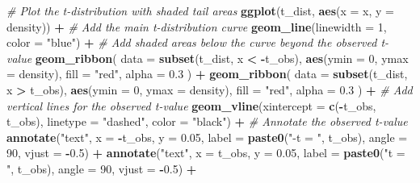 \documentclass[
]{book}
\newenvironment{Shaded}{\begin{snugshade}}{\end{snugshade}}
\newcommand{\AttributeTok}[1]{\textcolor[rgb]{0.13,0.29,0.53}{#1}}
\newcommand{\CommentTok}[1]{\textcolor[rgb]{0.56,0.35,0.01}{\textit{#1}}}
\newcommand{\DecValTok}[1]{\textcolor[rgb]{0.00,0.00,0.81}{#1}}
\newcommand{\FloatTok}[1]{\textcolor[rgb]{0.00,0.00,0.81}{#1}}
\newcommand{\FunctionTok}[1]{\textcolor[rgb]{0.13,0.29,0.53}{\textbf{#1}}}
\newcommand{\NormalTok}[1]{#1}
\newcommand{\SpecialCharTok}[1]{\textcolor[rgb]{0.81,0.36,0.00}{\textbf{#1}}}
\newcommand{\StringTok}[1]{\textcolor[rgb]{0.31,0.60,0.02}{#1}}
\begin{document}
\begin{Shaded}
\begin{Highlighting}[]
\CommentTok{\# Plot the t{-}distribution with shaded tail areas}
\FunctionTok{ggplot}\NormalTok{(t\_dist, }\FunctionTok{aes}\NormalTok{(}\AttributeTok{x =}\NormalTok{ x, }\AttributeTok{y =}\NormalTok{ density)) }\SpecialCharTok{+}
  \CommentTok{\# Add the main t{-}distribution curve}
  \FunctionTok{geom\_line}\NormalTok{(}\AttributeTok{linewidth =} \DecValTok{1}\NormalTok{, }\AttributeTok{color =} \StringTok{"blue"}\NormalTok{) }\SpecialCharTok{+}
  \CommentTok{\# Add shaded areas below the curve beyond the observed t{-}value}
  \FunctionTok{geom\_ribbon}\NormalTok{(}
    \AttributeTok{data =} \FunctionTok{subset}\NormalTok{(t\_dist, x }\SpecialCharTok{\textless{}} \SpecialCharTok{{-}}\NormalTok{t\_obs),}
    \FunctionTok{aes}\NormalTok{(}\AttributeTok{ymin =} \DecValTok{0}\NormalTok{, }\AttributeTok{ymax =}\NormalTok{ density),}
    \AttributeTok{fill =} \StringTok{"red"}\NormalTok{,}
    \AttributeTok{alpha =} \FloatTok{0.3}
\NormalTok{  ) }\SpecialCharTok{+}
  \FunctionTok{geom\_ribbon}\NormalTok{(}
    \AttributeTok{data =} \FunctionTok{subset}\NormalTok{(t\_dist, x }\SpecialCharTok{\textgreater{}}\NormalTok{ t\_obs),}
    \FunctionTok{aes}\NormalTok{(}\AttributeTok{ymin =} \DecValTok{0}\NormalTok{, }\AttributeTok{ymax =}\NormalTok{ density),}
    \AttributeTok{fill =} \StringTok{"red"}\NormalTok{,}
    \AttributeTok{alpha =} \FloatTok{0.3}
\NormalTok{  ) }\SpecialCharTok{+}
  \CommentTok{\# Add vertical lines for the observed t{-}value}
  \FunctionTok{geom\_vline}\NormalTok{(}\AttributeTok{xintercept =} \FunctionTok{c}\NormalTok{(}\SpecialCharTok{{-}}\NormalTok{t\_obs, t\_obs),}
             \AttributeTok{linetype =} \StringTok{"dashed"}\NormalTok{, }\AttributeTok{color =} \StringTok{"black"}\NormalTok{) }\SpecialCharTok{+}
  \CommentTok{\# Annotate the observed t{-}value}
  \FunctionTok{annotate}\NormalTok{(}\StringTok{"text"}\NormalTok{, }\AttributeTok{x =} \SpecialCharTok{{-}}\NormalTok{t\_obs, }\AttributeTok{y =} \FloatTok{0.05}\NormalTok{,}
           \AttributeTok{label =} \FunctionTok{paste0}\NormalTok{(}\StringTok{"{-}t = "}\NormalTok{, t\_obs), }\AttributeTok{angle =} \DecValTok{90}\NormalTok{, }\AttributeTok{vjust =} \SpecialCharTok{{-}}\FloatTok{0.5}\NormalTok{) }\SpecialCharTok{+}
  \FunctionTok{annotate}\NormalTok{(}\StringTok{"text"}\NormalTok{, }\AttributeTok{x =}\NormalTok{ t\_obs, }\AttributeTok{y =} \FloatTok{0.05}\NormalTok{,}
           \AttributeTok{label =} \FunctionTok{paste0}\NormalTok{(}\StringTok{"t = "}\NormalTok{, t\_obs), }\AttributeTok{angle =} \DecValTok{90}\NormalTok{, }\AttributeTok{vjust =} \SpecialCharTok{{-}}\FloatTok{0.5}\NormalTok{) }\SpecialCharTok{+}

\end{Highlighting}
\end{Shaded}
\end{document}
